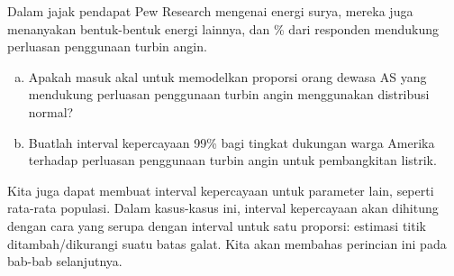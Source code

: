 \begin{exercisewrap}
\begin{nexercise}
\label{pew_wind_turbine_support_normal_dist_gp}%
Dalam jajak pendapat Pew Research mengenai energi surya, mereka
juga menanyakan bentuk-bentuk energi lainnya,
dan \pewwindpollpercent{}\% dari \pewwindpollsize{}
responden mendukung perluasan penggunaan
turbin angin.\footnotemark{}
\begin{enumerate}[(a)]
\item
    Apakah masuk akal untuk memodelkan proporsi
    orang dewasa AS yang mendukung perluasan penggunaan turbin angin
    menggunakan distribusi normal?
\item
    Buatlah interval kepercayaan 99\% bagi tingkat dukungan warga Amerika
    terhadap perluasan penggunaan turbin angin untuk pembangkitan
    listrik.
\end{enumerate}
\end{nexercise}
\end{exercisewrap}

Kita juga dapat membuat interval kepercayaan untuk
parameter lain, seperti rata-rata populasi.
Dalam kasus-kasus ini, interval kepercayaan akan dihitung
dengan cara yang serupa dengan interval untuk satu proporsi:
estimasi titik ditambah/dikurangi suatu batas galat.
Kita akan membahas perincian ini pada bab-bab selanjutnya.


